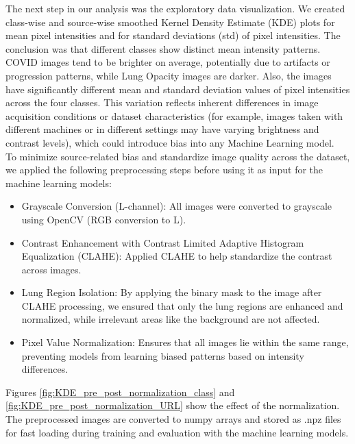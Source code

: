 \documentclass{article}
\begin{document}
The next step in our analysis was the exploratory data visualization. We created class-wise and source-wise smoothed Kernel Density Estimate (KDE) plots for mean pixel intensities and for standard deviations (std) of pixel intensities. The conclusion was that different classes show distinct mean intensity patterns. COVID images tend to be brighter on average, potentially due to artifacts or progression patterns, while Lung Opacity images are darker. Also, the images have significantly different mean and standard deviation values of pixel intensities across the four classes. This variation reflects inherent differences in image acquisition conditions or dataset characteristics (for example, images taken with different machines or in different settings may have varying brightness and contrast levels), which could introduce bias into any Machine Learning model.\\
To minimize source-related bias and standardize image quality across the dataset, we applied the following preprocessing steps before using it as input for the machine learning models:
\begin{itemize}
    \item Grayscale Conversion (L-channel): All images were converted to grayscale using OpenCV (RGB conversion to L).
    \item Contrast Enhancement with Contrast Limited Adaptive Histogram Equalization (CLAHE): Applied CLAHE to help standardize the contrast across images.
    \item Lung Region Isolation: By applying the binary mask to the image after CLAHE processing, we ensured that only the lung regions are enhanced and normalized, while irrelevant areas like the background are not affected.
     \item Pixel Value Normalization: Ensures that all images lie within the same range, preventing models from learning biased patterns based on intensity differences.
\end{itemize}

Figures \ref{fig:KDE_pre_post_normalization_class} and \ref{fig:KDE_pre_post_normalization_URL} show the effect of the normalization. \\
The preprocessed images are converted to numpy arrays and stored as .npz files for fast loading during training and evaluation with the machine learning models.
\end{document}
